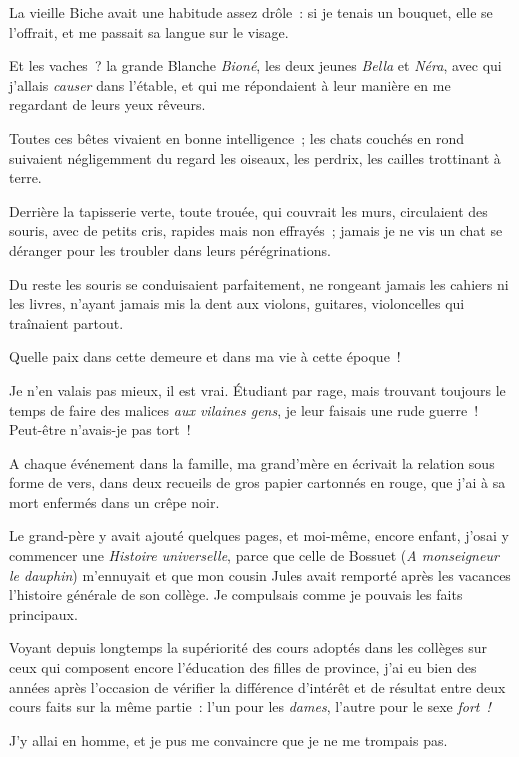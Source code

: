 \documentclass[french,twoside]{book} %
\begin{document}
La vieille Biche avait une habitude assez drôle : si je tenais un bouquet, elle se l’offrait, et me passait sa langue sur le visage.\par
Et les vaches ? la grande Blanche \emph{Bioné}, les deux jeunes \emph{Bella} et \emph{Néra}, avec qui j’allais \emph{causer }dans l’étable, et qui me répondaient à leur manière en me regardant de leurs yeux rêveurs.\par
Toutes ces bêtes vivaient en bonne intelligence ; les chats couchés en rond suivaient négligemment du regard les oiseaux, les perdrix, les cailles trottinant à terre.\par
Derrière la tapisserie verte, toute trouée, qui couvrait les murs, circulaient des souris, avec de petits cris, rapides mais non effrayés ; jamais je ne vis un chat se déranger pour les troubler dans leurs pérégrinations.\par
Du reste les souris se conduisaient parfaitement, ne rongeant jamais les cahiers ni les livres, n’ayant jamais mis la dent aux violons, guitares, violoncelles qui traînaient partout.\par
Quelle paix dans cette demeure et dans ma vie à cette époque !\par
 Je n’en valais pas mieux, il est vrai. Étudiant par rage, mais trouvant toujours le temps de faire des malices \emph{aux vilaines gens}, je leur faisais une rude guerre ! Peut-être n’avais-je pas tort !\par
A chaque événement dans la famille, ma grand’mère en écrivait la relation sous forme de vers, dans deux recueils de gros papier cartonnés en rouge, que j’ai à sa mort enfermés dans un crêpe noir.\par
Le grand-père y avait ajouté quelques pages, et moi-même, encore enfant, j’osai y commencer une \emph{Histoire universelle}, parce que celle de Bossuet (\emph{A monseigneur le dauphin}) m’ennuyait et que mon cousin Jules avait remporté après les vacances l’histoire générale de son collège. Je compulsais comme je pouvais les faits principaux.\par
Voyant depuis longtemps la supériorité des cours adoptés dans les collèges sur ceux qui composent encore l’éducation des filles de province, j’ai eu bien des années après l’occasion de vérifier la différence d’intérêt et de résultat entre deux cours faits sur la même partie : l’un pour les \emph{dames}, l’autre pour le sexe \emph{fort !}\par
J’y allai en homme, et je pus me convaincre que je ne me trompais pas.\par
\end{document}
